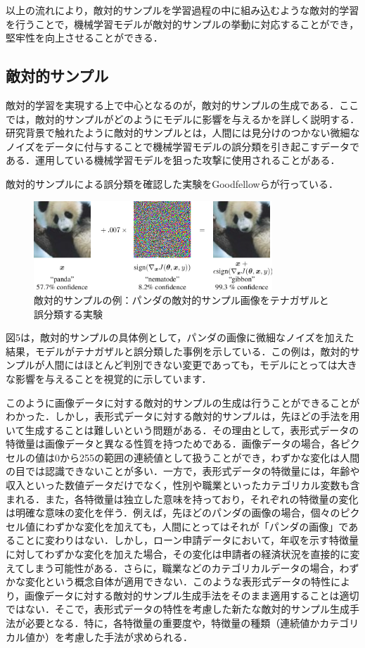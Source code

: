 以上の流れにより，敵対的サンプルを学習過程の中に組み込むような敵対的学習を行うことで，機械学習モデルが敵対的サンプルの挙動に対応することができ，堅牢性を向上させることができる．

\subsection{敵対的サンプル}
敵対的学習を実現する上で中心となるのが，敵対的サンプルの生成である．ここでは，敵対的サンプルがどのようにモデルに影響を与えるかを詳しく説明する．
研究背景で触れたように敵対的サンプルとは，人間には見分けのつかない微細なノイズをデータに付与することで機械学習モデルの誤分類を引き起こすデータである．\cite{MBSD-AdversarialExample}運用している機械学習モデルを狙った攻撃に使用されることがある．

敵対的サンプルによる誤分類を確認した実験をGoodfellowらが行っている\cite{goodfellow2015explaining}．
\begin{figure}[H]
    \centering
    \includegraphics[width=0.8\textwidth]{images/goodfellow_panda.png}
    \caption{敵対的サンプルの例：パンダの敵対的サンプル画像をテナガザルと誤分類する実験\cite{goodfellow2015explaining}}
    \label{fig:adversarial_example}
\end{figure}

図5は，敵対的サンプルの具体例として，パンダの画像に微細なノイズを加えた結果，モデルがテナガザルと誤分類した事例を示している．この例は，敵対的サンプルが人間にはほとんど判別できない変更であっても，モデルにとっては大きな影響を与えることを視覚的に示しています．

このように画像データに対する敵対的サンプルの生成は行うことができることがわかった．しかし，表形式データに対する敵対的サンプルは，先ほどの手法を用いて生成することは難しいという問題がある．その理由として，表形式データの特徴量は画像データと異なる性質を持つためである．画像データの場合，各ピクセルの値は0から255の範囲の連続値として扱うことができ，わずかな変化は人間の目では認識できないことが多い．一方で，表形式データの特徴量には，年齢や収入といった数値データだけでなく，性別や職業といったカテゴリカル変数も含まれる．また，各特徴量は独立した意味を持っており，それぞれの特徴量の変化は明確な意味の変化を伴う．例えば，先ほどのパンダの画像の場合，個々のピクセル値にわずかな変化を加えても，人間にとってはそれが「パンダの画像」であることに変わりはない．しかし，ローン申請データにおいて，年収を示す特徴量に対してわずかな変化を加えた場合，その変化は申請者の経済状況を直接的に変えてしまう可能性がある．さらに，職業などのカテゴリカルデータの場合，わずかな変化という概念自体が適用できない．このような表形式データの特性により，画像データに対する敵対的サンプル生成手法をそのまま適用することは適切ではない．そこで，表形式データの特性を考慮した新たな敵対的サンプル生成手法が必要となる．特に，各特徴量の重要度や，特徴量の種類（連続値かカテゴリカル値か）を考慮した手法が求められる．


